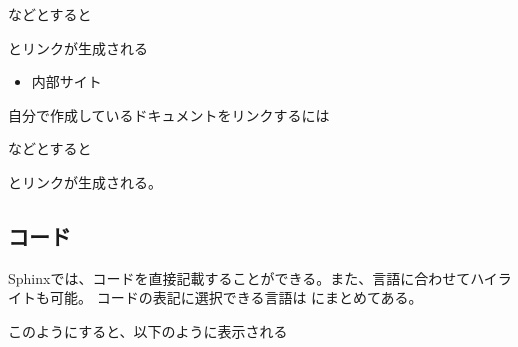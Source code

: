 \documentclass[letterpaper,10pt,dvipdfmx,report]{sphinxmanual}
\begin{document}
などとすると
\begin{quote}

\end{quote}

とリンクが生成される
\begin{itemize}
\item {} 
内部サイト

\end{itemize}

自分で作成しているドキュメントをリンクするには

\begin{sphinxVerbatim}[commandchars=\\\{\}]
\end{sphinxVerbatim}

などとすると
\begin{quote}

{\hyperref[\detokenize{index::doc}]{}}
\end{quote}

とリンクが生成される。


\subsection{コード}
\label{\detokenize{sphinx:id8}}
Sphinxでは、コードを直接記載することができる。また、言語に合わせてハイライトも可能。
コードの表記に選択できる言語は  にまとめてある。

\begin{sphinxVerbatim}[commandchars=\\\{\}]
  

      

      
      
        
\end{sphinxVerbatim}

このようにすると、以下のように表示される

\begin{sphinxVerbatim}[commandchars=\\\{\}]
  

  
  
    
\end{sphinxVerbatim}
\end{document}

